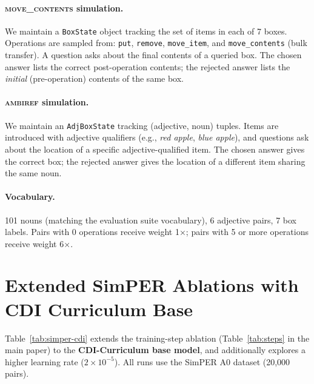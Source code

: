 \documentclass[11pt]{article}
\begin{document}
\paragraph{\textsc{move\_contents} simulation.}
We maintain a \texttt{BoxState} object tracking the set of items
in each of 7 boxes.
Operations are sampled from: \texttt{put}, \texttt{remove},
\texttt{move\_item}, and \texttt{move\_contents} (bulk transfer).
A question asks about the final contents of a queried box.
The chosen answer lists the correct post-operation contents;
the rejected answer lists the \emph{initial} (pre-operation)
contents of the same box.

\paragraph{\textsc{ambiref} simulation.}
We maintain an \texttt{AdjBoxState} tracking
(adjective, noun) tuples.
Items are introduced with adjective qualifiers
(e.g., \emph{red apple}, \emph{blue apple}),
and questions ask about the location of
a specific adjective-qualified item.
The chosen answer gives the correct box;
the rejected answer gives the location of a
different item sharing the same noun.

\paragraph{Vocabulary.}
101 nouns (matching the evaluation suite vocabulary),
6 adjective pairs, 7 box labels.
Pairs with 0 operations receive weight 1$\times$;
pairs with 5 or more operations receive weight 6$\times$.

\section{Extended SimPER Ablations with CDI Curriculum Base}
\label{app:simper-extended}

Table~\ref{tab:simper-cdi} extends the training-step ablation
(Table~\ref{tab:steps} in the main paper) to the
\textbf{CDI-Curriculum base model}, and additionally explores a
higher learning rate ($2{\times}10^{-5}$).
All runs use the SimPER A0 dataset (20{,}000 pairs).
\end{document}
